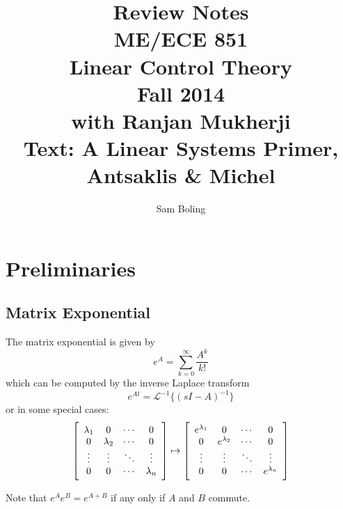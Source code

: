 \documentclass{report}
\author{Sam Boling}
\title{
  Review Notes \\
  ME/ECE 851 \\
  Linear Control Theory \\
  Fall 2014 \\
  with Ranjan Mukherji \\
  Text: A Linear Systems Primer, Antsaklis \& Michel
}
\begin{document}
\begin{titlepage}
\maketitle
\end{titlepage}

\section{Preliminaries}

\subsection{Matrix Exponential}
The matrix exponential is given by
$$
e^{A} = \sum_{k=0}^\infty \frac{A^k}{k!}
$$
which can be computed by the inverse Laplace transform
$$
e^{At} = \mathcal{L}^{-1}\{(sI - A)^{-1}\}
$$
or in some special cases:
$$
\left[\begin{array}{c c c c}
  \lambda_1 & 0          & \cdots & 0      \\
  0         & \lambda_2  & \cdots & 0      \\
  \vdots    & \vdots     & \ddots & \vdots \\
  0         & 0          & \cdots & \lambda_n
\end{array}\right]
\mapsto
\left[\begin{array}{c c c c}
  e^{\lambda_1} & 0           & \cdots & 0      \\
  0           & e^{\lambda_2} & \cdots & 0      \\
  \vdots      & \vdots      & \ddots & \vdots \\
  0           & 0           & \cdots & e^{\lambda_n}
\end{array}\right]
$$

Note that $e^{A} e^{B} = e^{A + B}$ if any only if $A$ and $B$ commute.
\end{document}
